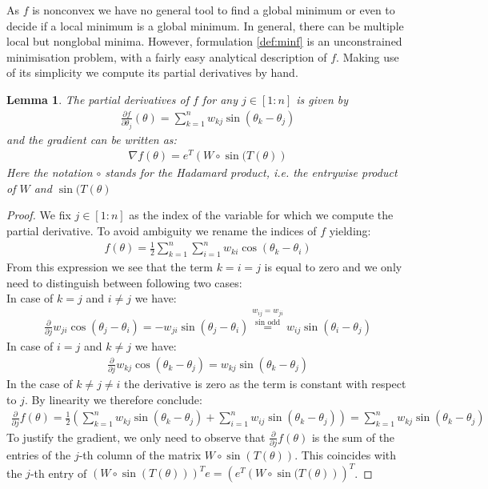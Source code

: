 \documentclass[12pt,a4paper]{article}
\theoremstyle{mythm}
\newtheorem{lem}[thm]{Lemma}
\begin{document}
As $ f $ is nonconvex we have no general tool to find a global minimum or even to decide if a local minimum is a global minimum.
In general, there can be multiple local but nonglobal minima.
However, formulation \ref{def:minf} is an unconstrained minimisation problem, with a fairly easy analytical description of $ f $. 
Making use of its simplicity we compute its partial derivatives by hand.
\begin{lem}
The partial derivatives of $ f $ for any $ j \in \left[ 1 : n \right]  $ is given by
\begin{align*}
\frac{ \partial f }{ \partial \theta _{ j }  } (\theta) = \sum_{ k = 1 }^{ n } w _{ kj } \sin \left( \theta _{ k } - \theta _{ j }  \right) 
\end{align*} 
and the gradient can be written as:
\begin{align}
\label{eq:gradf} 
\nabla f(\theta) = e^T\left( W \circ \sin( T(\theta )  \right) 
\end{align} 
Here the notation $ \circ $ stands for the Hadamard product, i.e. the entrywise product of $ W $ and $ \sin( T (\theta )  $ 
\end{lem} 
\begin{proof}
We fix $ j \in \left[ 1:n \right] $ as the index of the variable for which we compute the partial derivative. To avoid ambiguity we rename the indices of $ f $ yielding:
\begin{align*}
f(\theta) = \frac{ 1 }{ 2 } \sum_{ k = 1 }^{ n } \sum_{ i = 1 }^{ n } w _{ ki } \cos( \theta_k - \theta_i ) 
\end{align*} 
From this expression we see that the term $ k=i=j $ is equal to zero and we only need to distinguish between following two cases: \\
In case of $ k = j $ and $ i \neq j  $ we have:
\begin{align*}
\frac{ \partial  }{ \partial j } w _{ ji } \cos( \theta _{ j } - \theta_i)  = -w _{ ji } \sin( \theta_j - \theta_i  ) 
\overset{ w _{ ij } = w _{ ji }  }{ \overset{ \sin \text{ odd}   }{ =}  } 
w _{ij} \sin( \theta_i - \theta_j) 
\end{align*} 
In case of $ i = j $ and $ k \neq j  $ we have:
\begin{align*}
\frac{ \partial  }{ \partial j } w _{ kj } \cos( \theta _{ k } - \theta_j)  = w _{ kj } \sin( \theta_k - \theta_j  ) 
\end{align*} 
In the case of $ k \neq j \neq i $ the derivative is zero as the term is constant with respect to $ j $. 
By linearity we therefore conclude:
\begin{align*}
\frac{ \partial  }{ \partial j } f(\theta) = \frac{ 1 }{ 2 } \left( \sum_{ k = 1 }^{ n } w _{ kj } \sin( \theta_k - \theta_j ) + \sum_{ i = 1 }^{ n } w _{ ij } \sin( \theta_k
- \theta_j )   \right) = \sum_{ k = 1 }^{ n } w _{ kj } \sin( \theta_k - \theta_j )
\end{align*} 
To justify the gradient, we only need to observe that $ \frac{ \partial  }{ \partial j } f(\theta) $ is the sum of the entries of the $ j $-th column of the matrix $ W \circ
\sin( T(\theta) )  $. This coincides with the $ j $-th entry of $ \left( W \circ \sin( T(\theta) )  \right) ^T e = \left( e^T \left( W \circ \sin( T (\theta )  \right)
\right)^T$.
\end{proof}
\end{document}
